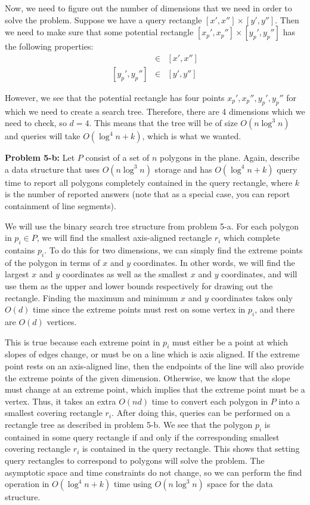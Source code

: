 \documentclass[psamsfonts]{amsart}
\newenvironment{sol}{\vspace{0.25cm}{\large \bfseries Solution:}}{\qedsymbol}
\newenvironment{prob}[1]{\begin{framed}{\large \bfseries Problem #1:}}{\end{framed}}
\begin{document}
\begin{sol}
Now, we need to figure out the number of dimensions that we need in order to solve the problem. Suppose we have a query rectangle $[x', x''] \times [y', y'']$. Then we need to make sure that some potential rectangle $[x_p', x_p''] \times [y_p', y_p'']$ has the following properties:
\begin{eqnarray}
[x_p', x_p''] &\in& [x', x''] \\
\left[y_p', y_p'' \right] &\in& [y', y'']
\end{eqnarray}

However, we see that the potential rectangle has four points $x_p', x_p'', y_p', y_p''$ for which we need to create a search tree. Therefore, there are 4 dimensions which we need to check, so $d = 4$. This means that the tree will be of size $O(n \log^3 n)$ and queries will take $O(\log^4 n + k)$, which is what we wanted.
\end{sol}

\begin{prob}{5-b}
Let $P$ consist of a set of $n$ polygons in the plane. Again, describe a data structure that uses $O(n \log^3 n)$ storage and has $O(\log^4 n + k)$ query time to report all polygons completely contained in the query rectangle, where $k$ is the number of reported answers (note that as a special case, you can report containment of line segments).
\end{prob}
\begin{sol}
We will use the binary search tree structure from problem 5-a. For each polygon in $p_i \in P$, we will find the smallest axis-aligned rectangle $r_i$ which complete contains $p_i$. To do this for two dimensions, we can simply find the extreme points of the polygon in terms of $x$ and $y$ coordinates. In other words, we will find the largest $x$ and $y$ coordinates as well as the smallest $x$ and $y$ coordinates, and will use them as the upper and lower bounds respectively for drawing out the rectangle. Finding the maximum and minimum $x$ and $y$ coordinates takes only $O(d)$ time since the extreme points must rest on some vertex in $p_i$, and there are $O(d)$ vertices.

This is true because each extreme point in $p_i$ must either be a point at which slopes of edges change, or must be on a line which is axis aligned. If the extreme point rests on an axis-aligned line, then the endpoints of the line will also provide the extreme points of the given dimension. Otherwise, we know that the slope must change at an extreme point, which implies that the extreme point must be a vertex. Thus, it takes an extra $O(nd)$ time to convert each polygon in $P$ into a smallest covering rectangle $r_i$. After doing this, queries can be performed on a rectangle tree as described in problem 5-b. We see that the polygon $p_i$ is contained in some query rectangle if and only if the corresponding smallest covering rectangle $r_i$ is contained in the query rectangle. This shows that setting query rectangles to correspond to polygons will solve the problem. The asymptotic space and time constraints do not change, so we can perform the find operation in $O(\log^4 n + k)$ time using $O(n \log^3 n)$ space for the data structure.
\end{sol}
\end{document}
